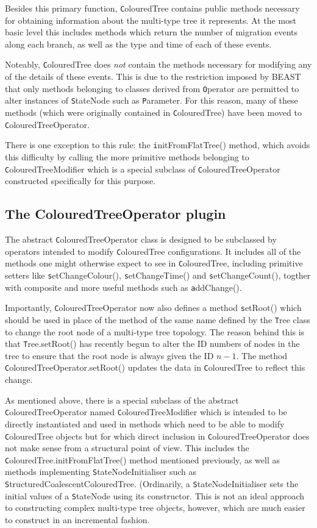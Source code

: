 \documentclass[a4paper,11pt]{article}
\newcommand{\class}[1]{{\texttt #1}}
\newcommand{\method}[1]{{\texttt #1}}
\begin{document}
Besides this primary function, \class{ColouredTree} contains public
methods necessary for obtaining information about the multi-type tree
it represents.  At the most basic level this includes methods which
return the number of migration events along each branch, as well as
the type and time of each of these events.

Noteably, \class{ColouredTree} does \emph{not} contain the methods
necessary for modifying any of the details of these events.  This is
due to the restriction imposed by BEAST that only methods belonging to
classes derived from \class{Operator} are permitted to alter instances
of \class{StateNode} such as \class{Parameter}.  For this reason,
many of these methods (which were originally contained in
\class{ColouredTree}) have been moved to \class{ColouredTreeOperator}.

There is one exception to this rule: the \method{initFromFlatTree()}
method, which avoids this difficulty by calling the more primitive
methods belonging to \class{ColouredTreeModifier} which is a special
subclass of \class{ColouredTreeOperator} constructed specifically for
this purpose.

\subsection{The ColouredTreeOperator plugin}

The abstract \class{ColouredTreeOperator} class is designed to be
subclassed by operators intended to modify \class{ColouredTree}
configurations.  It includes all of the methods one might otherwise
expect to see in \class{ColouredTree}, including primitive setters
like \method{setChangeColour()}, \method{setChangeTime()} and
\method{setChangeCount()}, togther with composite and more useful
methods such as \method{addChange()}.

Importantly, \class{ColouredTreeOperator} now also defines a method
\method{setRoot()} which should be used in place of the method of the
same name defined by the \class{Tree} class to change the root node of
a multi-type tree topology.  The reason behind this is that
\class{Tree.setRoot()} has recently begun to alter the ID numbers of
nodes in the tree to ensure that the root node is always given the ID
$n-1$.  The method \class{ColouredTreeOperator.setRoot()} updates the
data in \class{ColouredTree} to reflect this change.

As mentioned above, there is a special subclass of the abstract
\class{ColouredTreeOperator} named \class{ColouredTreeModifier} which
is intended to be directly instantiated and used in methods which need
to be able to modify \class{ColouredTree} objects but for which direct
inclusion in \class{ColouredTreeOperator} does not make sense from a
structural point of view.  This includes the
\class{ColouredTree.initFromFlatTree()} method mentioned previously,
as well as methods implementing \class{StateNodeInitialiser} such as
\class{StructuredCoalescentColouredTree}. (Ordinarily, a
\class{StateNodeInitialiser} sets the initial values of a
\class{StateNode} using its constructor.  This is not an ideal
approach to constructing complex multi-type tree objects, however,
which are much easier to construct in an incremental fashion.
\end{document}

